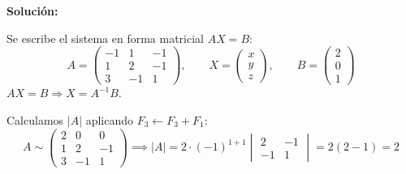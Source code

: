 \documentclass[12pt]{article}
\newcommand{\solucion}{%
    \vspace{0.8em}%
    \textbf{Solución:}%
}
\begin{document}
\solucion

Se escribe el sistema en forma matricial $AX = B$:
\[
A = \begin{pmatrix}-1&1&-1\\1&2&-1\\3&-1&1\end{pmatrix}, \qquad
X = \begin{pmatrix}x\\y\\z\end{pmatrix}, \qquad
B = \begin{pmatrix}2\\0\\1\end{pmatrix}
\]
$AX=B \Rightarrow X = A^{-1}B$.

Calculamos $|A|$ aplicando $F_3 \leftarrow F_3 + F_1$:
\[
A \sim \begin{pmatrix}2&0&0\\1&2&-1\\3&-1&1\end{pmatrix}
\implies
|A| = 2\cdot(-1)^{1+1}\begin{vmatrix}2&-1\\-1&1\end{vmatrix} = 2(2-1) = 2
\]
\end{document}
